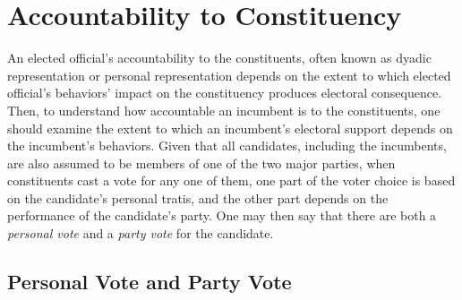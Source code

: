 \documentclass{article}
\begin{document}
		
		
	\section*{Accountability to Constituency}
		
		An elected official's accountability
		to the constituents,
		often known as dyadic representation
		\autocites
		[][]
		{millerConstituencyInfluenceCongress1963}
		{weissbergCollectiveVsDyadic1978}
		{ansolabehereDyadicRepresentation2011}
		or personal representation
		\autocites
		[][]
		{colomerPersonalRepresentationNeglected2011}
		depends on
		the extent to which elected official's behaviors' impact on the constituency
		produces electoral consequence.
		Then,
		to understand how accountable an incumbent is to the constituents,
		one should examine
		the extent to which an incumbent's electoral support depends on the incumbent's behaviors.
		Given that all candidates,
		including the incumbents,
		are also
		assumed to be
		members of one of the two major parties,
		when constituents cast a vote for any one of them,
		one part of the voter choice is based on the candidate's personal tratis,
		and the other part depends on the performance of the candidate's party. 
		One may then say that there are both
		a \textit{personal vote}
		and a \textit{party vote} for the candidate.
	
		\subsection*{Personal Vote and Party Vote}
		
\end{document}
